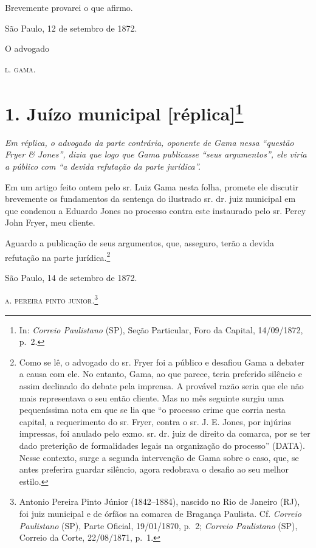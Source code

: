 Brevemente provarei o que afirmo.
\begin{flushright}
São Paulo, 12 de setembro de 1872.

O advogado

\textsc{l. gama}.
\end{flushright}
\chapter{1. Juízo municipal {[}réplica{]}\footnote{ In: \emph{Correio Paulistano} (SP), Seção Particular, Foro
  da Capital, 14/09/1872, p.~2.}} %

\begin{didascalia}
\emph{Em réplica, o advogado da parte contrária, oponente de Gama nessa
``questão Fryer \& Jones'', dizia que logo que Gama publicasse ``seus
argumentos'', ele viria a público com ``a devida refutação da parte
jurídica''.}
\end{didascalia}

\asterisc{}

Em um artigo feito ontem pelo sr. Luiz Gama nesta folha, promete ele
discutir brevemente os fundamentos da sentença do ilustrado sr. dr. juiz
municipal em que condenou a Eduardo Jones no processo contra este
instaurado pelo sr. Percy John Fryer, meu cliente.

Aguardo a publicação de seus argumentos, que, asseguro, terão a devida
refutação na parte jurídica.\footnote{ Como se lê, o advogado do sr.
  Fryer foi a público e desafiou Gama a debater a causa com ele. No
  entanto, Gama, ao que parece, teria preferido silêncio e assim
  declinado do debate pela imprensa. A provável razão seria que ele não
  mais representava o seu então cliente. Mas no mês seguinte surgiu uma
  pequeníssima nota em que se lia que ``o processo crime que corria nesta
  capital, a requerimento do sr. Fryer, contra o sr. J. E. Jones, por
  injúrias impressas, foi anulado pelo exmo. sr. dr. juiz de direito da
  comarca, por se ter dado preterição de formalidades legais na
  organização do processo'' (DATA). Nesse contexto, surge a segunda
  intervenção de Gama sobre o caso, que, se antes preferira guardar
  silêncio, agora redobrava o desafio ao seu melhor estilo.}
\begin{flushright}
São Paulo, 14 de setembro de 1872.

\textsc{a. pereira pinto junior}.\footnote{ Antonio Pereira Pinto Júnior
  (1842--1884), nascido no Rio de Janeiro (RJ), foi juiz municipal e de
  órfãos na comarca de Bragança Paulista. Cf. \emph{Correio Paulistano}
  (SP), Parte Oficial, 19/01/1870, p.~2; \emph{Correio Paulistano} (SP),
  Correio da Corte, 22/08/1871, p.~1.}
\end{flushright}
